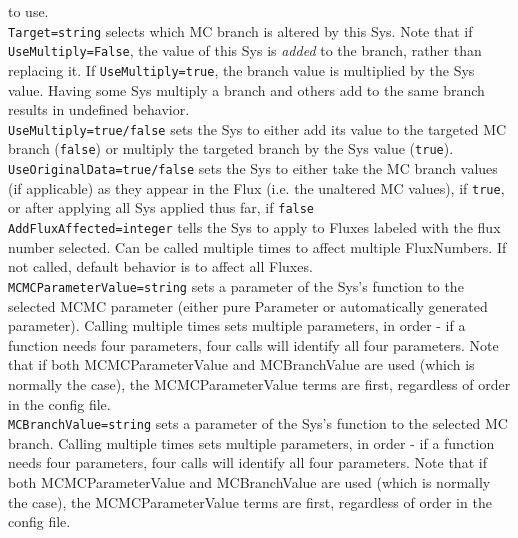 to use.\medskip\\
\verb|Target=string| selects which MC branch is altered by this Sys.
Note that if \verb|UseMultiply=False|, the value of this Sys is
\emph{added} to the branch, rather than replacing it.  If
\verb|UseMultiply=true|, the branch value is multiplied by the Sys
value.  Having some Sys multiply a branch and others add to the same
branch results in undefined behavior.\medskip\\
\verb|UseMultiply=true/false| sets the Sys to either add its value to
the targeted MC branch (\verb|false|) or multiply the targeted branch
by the Sys value (\verb|true|).\medskip\\
\verb|UseOriginalData=true/false| sets the Sys to either take the MC
branch values (if applicable) as they appear in the Flux (i.e. the
unaltered MC values), if \verb|true|, or after applying all Sys
applied thus far, if \verb|false|\medskip\\
\verb|AddFluxAffected=integer| tells the Sys to apply to Fluxes
labeled with the flux number selected.  Can be called multiple times
to affect multiple FluxNumbers.  If not called, default behavior is to
affect all Fluxes.\medskip\\
\verb|MCMCParameterValue=string| sets a parameter of the Sys's
function to the selected MCMC parameter (either pure Parameter or
automatically generated parameter).  Calling multiple times sets
multiple parameters, in order - if a function needs four parameters,
four calls will identify all four parameters.  Note that if both
MCMCParameterValue and MCBranchValue are used (which is normally the
case), the MCMCParameterValue terms are first, regardless of order in
the config file.\medskip\\
\verb|MCBranchValue=string| sets a parameter of the Sys's function to
the selected MC branch.  Calling multiple times sets multiple
parameters, in order - if a function needs four parameters, four calls
will identify all four parameters.  Note that if both
MCMCParameterValue and MCBranchValue are used (which is normally the
case), the MCMCParameterValue terms are first, regardless of order in
the config file.\medskip\\


